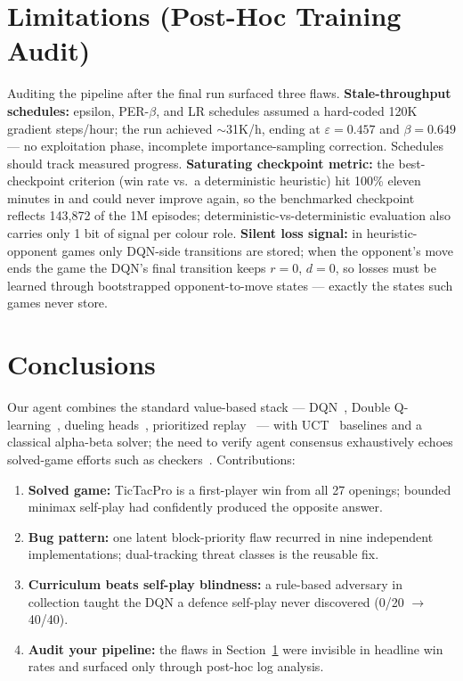 \documentclass[10pt,twocolumn]{article}
\begin{document}
\section{Limitations (Post-Hoc Training Audit)}
\label{sec:limitations}

Auditing the pipeline after the final run surfaced three flaws.
\textbf{Stale-throughput schedules:} epsilon, PER-$\beta$, and LR schedules
assumed a hard-coded 120K gradient steps/hour; the run achieved $\sim$31K/h,
ending at $\varepsilon = 0.457$ and $\beta = 0.649$ --- no exploitation
phase, incomplete importance-sampling correction. Schedules should track
measured progress. \textbf{Saturating checkpoint metric:} the
best-checkpoint criterion (win rate vs.\ a deterministic heuristic) hit
100\% eleven minutes in and could never improve again, so the benchmarked
checkpoint reflects 143,872 of the 1M episodes; deterministic-vs-deterministic
evaluation also carries only 1 bit of signal per colour role.
\textbf{Silent loss signal:} in heuristic-opponent games only DQN-side
transitions are stored; when the opponent's move ends the game the DQN's
final transition keeps $r=0$, $d=0$, so losses must be learned through
bootstrapped opponent-to-move states --- exactly the states such games never
store.

\section{Conclusions}

Our agent combines the standard value-based stack --- DQN~\cite{mnih2015},
Double Q-learning~\cite{vanhasselt2016}, dueling heads~\cite{wang2016},
prioritized replay~\cite{schaul2016} --- with UCT~\cite{kocsis2006} baselines
and a classical alpha-beta solver; the need to verify agent consensus
exhaustively echoes solved-game efforts such as checkers~\cite{schaeffer2007}.
Contributions:

\begin{enumerate}[noitemsep,topsep=2pt,leftmargin=*]
  \item \textbf{Solved game:} TicTacPro is a first-player win from all 27
        openings; bounded minimax self-play had confidently produced the
        opposite answer.
  \item \textbf{Bug pattern:} one latent block-priority flaw recurred in nine
        independent implementations; dual-tracking threat classes is the
        reusable fix.
  \item \textbf{Curriculum beats self-play blindness:} a rule-based adversary
        in collection taught the DQN a defence self-play never discovered
        (0/20 $\to$ 40/40).
  \item \textbf{Audit your pipeline:} the flaws in
        Section~\ref{sec:limitations} were invisible in headline win rates
        and surfaced only through post-hoc log analysis.
\end{enumerate}
\end{document}
